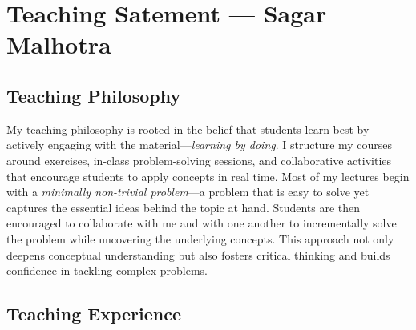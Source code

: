 \documentclass[10pt, a4paper]{article}
\begin{document}
\section*{Teaching Satement --- Sagar Malhotra}

\subsection*{Teaching Philosophy}
My teaching philosophy is rooted in the belief that students learn best by actively engaging with the material—\emph{learning by doing}.
I structure my courses around exercises, in-class problem-solving sessions, and collaborative activities that encourage students to apply concepts in real time.
Most of my lectures begin with a \emph{minimally non-trivial problem}—a problem that is easy to solve yet captures the essential ideas behind the topic at hand.
Students are then encouraged to collaborate with me and with one another to incrementally solve the problem while uncovering the underlying concepts.
This approach not only deepens conceptual understanding but also fosters critical thinking and builds confidence in tackling complex problems.

\subsection*{Teaching Experience}
\end{document}
